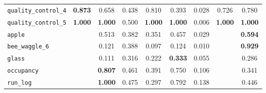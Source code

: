 \begin{tabular}{lcccccccc}
\verb+quality_control_4+ & \textbf{0.873} & 0.658 & 0.438 & 0.810 & 0.393 & 0.028 & 0.726 & 0.780\\
\verb+quality_control_5+ & \textbf{1.000} & \textbf{1.000} & 0.500 & \textbf{1.000} & \textbf{1.000} & 0.006 & \textbf{1.000} & \textbf{1.000}\\
\midrule
\verb+apple+ &  & 0.513 & 0.382 & 0.351 & 0.457 & 0.029 &  & \textbf{0.594}\\
\verb+bee_waggle_6+ &  & 0.121 & 0.388 & 0.097 & 0.124 & 0.010 &  & \textbf{0.929}\\
\verb+glass+ &  & 0.111 & 0.316 & 0.222 & \textbf{0.333} & 0.055 &  & 0.286\\
\verb+occupancy+ &  & \textbf{0.807} & 0.461 & 0.391 & 0.750 & 0.106 &  & 0.341\\
\verb+run_log+ &  & \textbf{1.000} & 0.475 & 0.297 & 0.792 & 0.138 &  & 0.446\\
\bottomrule
\end{tabular}
